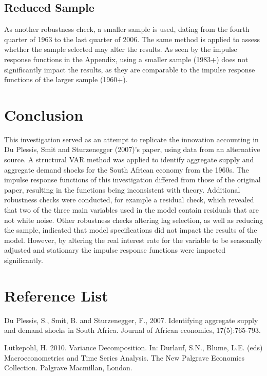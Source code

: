 \documentclass[11pt,preprint, authoryear]{elsarticle}
\numberwithin{equation}{section}
\numberwithin{figure}{section}
\numberwithin{table}{section}
\begin{document}
\hypertarget{reduced-sample}{%
\subsection{Reduced Sample}\label{reduced-sample}}

As another robustness check, a smaller sample is used, dating from the
fourth quarter of 1963 to the last quarter of 2006. The same method is
applied to assess whether the sample selected may alter the results. As
seen by the impulse response functions in the Appendix, using a smaller
sample (1983+) does not significantly impact the results, as they are
comparable to the impulse response functions of the larger sample
(1960+).

\hypertarget{conclusion}{%
\section{Conclusion}\label{conclusion}}

This investigation served as an attempt to replicate the innovation
accounting in Du Plessis, Smit and Sturzenegger (2007)'s paper, using
data from an alternative source. A structural VAR method was applied to
identify aggregate supply and aggregate demand shocks for the South
African economy from the 1960s. The impulse response functions of this
investigation differed from those of the original paper, resulting in
the functions being inconsistent with theory. Additional robustness
checks were conducted, for example a residual check, which revealed that
two of the three main variables used in the model contain residuals that
are not white noise. Other robustness checks altering lag selection, as
well as reducing the sample, indicated that model specifications did not
impact the results of the model. However, by altering the real interest
rate for the variable to be seasonally adjusted and stationary the
impulse response functions were impacted significantly.

\newpage

\hypertarget{reference-list}{%
\section{Reference List}\label{reference-list}}

Du Plessis, S., Smit, B. and Sturzenegger, F., 2007. Identifying
aggregate supply and demand shocks in South Africa. Journal of African
economies, 17(5):765-793.

Lütkepohl, H. 2010. Variance Decomposition. In: Durlauf, S.N., Blume,
L.E. (eds) Macroeconometrics and Time Series Analysis. The New Palgrave
Economics Collection. Palgrave Macmillan, London.
\end{document}
